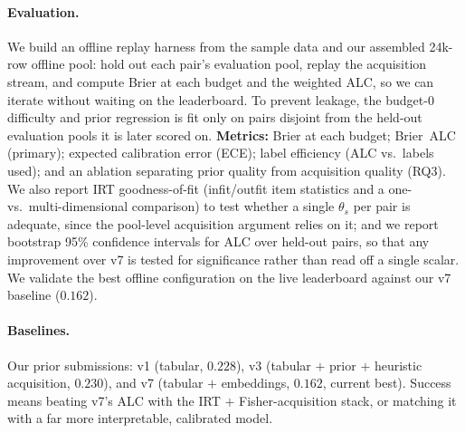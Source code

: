 \documentclass{article}
\begin{document}
\paragraph{Evaluation.} We build an offline replay harness from the sample data
and our assembled 24k-row offline pool: hold out each pair's evaluation pool,
replay the acquisition stream, and compute Brier at each budget and the weighted
ALC, so we can iterate without waiting on the leaderboard. To prevent leakage, the
budget-0 difficulty and prior regression is fit only on pairs disjoint from the
held-out evaluation pools it is later scored on. \textbf{Metrics:}
Brier at each budget; Brier~ALC (primary); expected calibration error (ECE); label
efficiency (ALC vs.\ labels used); and an ablation separating prior quality from
acquisition quality (RQ3). We also report IRT goodness-of-fit (infit/outfit item
statistics and a one- vs.\ multi-dimensional comparison) to test whether a single
$\theta_s$ per pair is adequate, since the pool-level acquisition argument relies
on it; and we report bootstrap 95\% confidence intervals for ALC over held-out
pairs, so that any improvement over v7 is tested for significance rather than read
off a single scalar. We validate the best offline configuration on the live
leaderboard against our v7 baseline ($0.162$).

\paragraph{Baselines.} Our prior submissions: v1 (tabular, $0.228$), v3 (tabular
$+$ prior $+$ heuristic acquisition, $0.230$), and v7 (tabular $+$ embeddings,
$\mathbf{0.162}$, current best). Success means beating v7's ALC with the IRT $+$
Fisher-acquisition stack, or matching it with a far more interpretable, calibrated
model.
\end{document}

